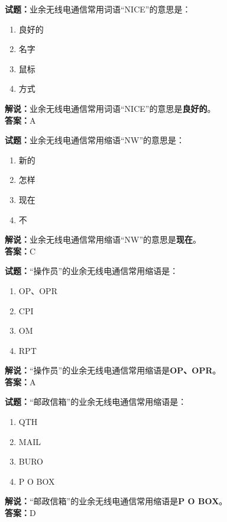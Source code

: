 \documentclass{ctexbook}
\begin{document}
\bigskip


\noindent\textbf{试题：}业余无线电通信常用词语“NICE”的意思是：
\begin{enumerate}[leftmargin=3em]
\item 良好的
\item 名字
\item 鼠标
\item 方式
\end{enumerate}
\noindent\textbf{解说：}业余无线电通信常用词语“NICE”的意思是\textbf{良好的}。\\\noindent\textbf{答案：}A



\bigskip


\noindent\textbf{试题：}业余无线电通信常用缩语“NW”的意思是：
\begin{enumerate}[leftmargin=3em]
\item 新的
\item 怎样
\item 现在
\item 不
\end{enumerate}
\noindent\textbf{解说：}业余无线电通信常用缩语“NW”的意思是\textbf{现在}。\\\noindent\textbf{答案：}C



\bigskip


\noindent\textbf{试题：}“操作员”的业余无线电通信常用缩语是：
\begin{enumerate}[leftmargin=3em]
\item OP、OPR
\item CPI
\item OM
\item RPT
\end{enumerate}
\noindent\textbf{解说：}“操作员”的业余无线电通信常用缩语是\textbf{OP、OPR}。\\\noindent\textbf{答案：}A



\bigskip


\noindent\textbf{试题：}“邮政信箱”的业余无线电通信常用缩语是：
\begin{enumerate}[leftmargin=3em]
\item QTH
\item MAIL
\item BURO
\item P O BOX
\end{enumerate}
\noindent\textbf{解说：}“邮政信箱”的业余无线电通信常用缩语是\textbf{P O BOX}。\\\noindent\textbf{答案：}D
\end{document}
